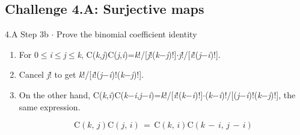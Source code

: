 \documentclass[11pt]{article}
\begin{document}
\begin{keepsection}\subsection{Challenge 4.A: Surjective maps}

\begin{workedbox}{4.A Step 3b \ensuremath{\cdot} Prove the binomial coefficient identity}
\begin{enumerate}
\item For 0\ensuremath{\leq}\textit{i}\ensuremath{\leq}\textit{j}\ensuremath{\leq}\textit{k}, C(\textit{k},\textit{j})C(\textit{j},\textit{i})=\textit{k}!/[\textit{j}!(\textit{k}\ensuremath{-}\textit{j})!]\ensuremath{\cdot}\textit{j}!/[\textit{i}!(\textit{j}\ensuremath{-}\textit{i})!].
\item Cancel \textit{j}! to get \textit{k}!/[\textit{i}!(\textit{j}\ensuremath{-}\textit{i})!(\textit{k}\ensuremath{-}\textit{j})!].
\item {}
On the other hand, C(\textit{k},\textit{i})C(\textit{k}\ensuremath{-}\textit{i},\textit{j}\ensuremath{-}\textit{i})=\textit{k}!/[\textit{i}!(\textit{k}\ensuremath{-}\textit{i})!]\ensuremath{\cdot}(\textit{k}\ensuremath{-}\textit{i})!/[(\textit{j}\ensuremath{-}\textit{i})!(\textit{k}\ensuremath{-}\textit{j})!], the same expression.

\begin{equation*}\mathrm{C}({k},\, {j})\mathrm{C}({j},\, {i})\, =\, \mathrm{C}({k},\, {i})\mathrm{C}({k}\, -\, {i},\, {j}\, -\, {i})\end{equation*}
\end{enumerate}
\end{workedbox}

\end{keepsection}
\end{document}
